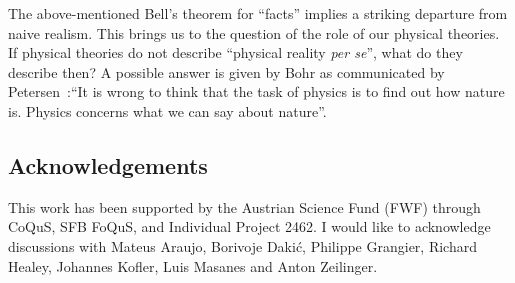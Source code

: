 \documentclass[12pt,a4]{article}
\begin{document}
The above-mentioned Bell's theorem for ``facts'' implies a striking departure from naive realism. This brings us to the question of the role of our physical theories. If physical theories do not describe ``physical reality {\it per se}'', what do they describe then? A possible answer is given by Bohr as communicated by Petersen~\cite{bohr}:``It is wrong to think that the task of physics is to find out how nature is. Physics concerns what we can say about nature''.

\subsection*{Acknowledgements}
This work has been supported by the Austrian Science Fund (FWF) through CoQuS, SFB FoQuS, and Individual Project 2462. I would like to acknowledge discussions with Mateus Araujo, Borivoje Daki{\'c}, Philippe Grangier, Richard Healey, Johannes Kofler, Luis Masanes and Anton Zeilinger.
\end{document}
